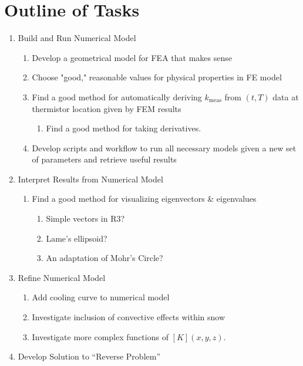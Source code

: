 \documentclass[10pt, letterpaper]{article}
\begin{document}
    \section{Outline of Tasks}
    \begin{enumerate}
        \item Build and Run Numerical Model
        \begin{enumerate}
            \item Develop a geometrical model for FEA that makes sense
            \item Choose "good," reasonable values for physical properties in FE model
            \item Find a good method for automatically deriving \(k_\textrm{meas}\) from \((t,T)\) data at thermistor location given by FEM results
            \begin{enumerate}
                \item Find a good method for taking derivatives.
            \end{enumerate}
            \item Develop scripts and workflow to run all necessary models given a new set of parameters and retrieve useful results
        \end{enumerate}
        \item Interpret Results from Numerical Model
        \begin{enumerate}
            \item Find a good method for visualizing eigenvectors \& eigenvalues
            \begin{enumerate}
                \item Simple vectors in R3?
                \item Lame's ellipsoid?
                \item An adaptation of Mohr's Circle?
            \end{enumerate}
        \end{enumerate}
        \item Refine Numerical Model
        \begin{enumerate}
            \item Add cooling curve to numerical model
            \item Investigate inclusion of convective effects within snow
            \item Investigate more complex functions of \([K](x,y,z)\).
        \end{enumerate}
        \item Develop Solution to ``Reverse Problem''

\end{enumerate}
\end{document}
